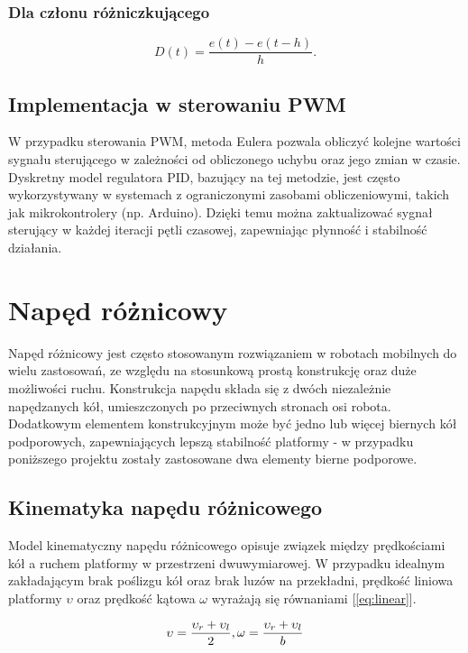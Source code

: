 \subsubsection*{Dla członu różniczkującego}

\begin{equation}
    D(t) = \frac{e(t) - e(t - h)}{h}.
\end{equation}

\subsection{Implementacja w sterowaniu PWM}

W przypadku sterowania PWM, metoda Eulera pozwala obliczyć kolejne wartości sygnału sterującego w zależności od obliczonego uchybu oraz jego zmian w czasie. Dyskretny model regulatora PID, bazujący na tej metodzie, jest często wykorzystywany w systemach z ograniczonymi zasobami obliczeniowymi, takich jak mikrokontrolery (np. Arduino). Dzięki temu można zaktualizować sygnał sterujący w każdej iteracji pętli czasowej, zapewniając płynność i stabilność działania.

\section{Napęd różnicowy}

Napęd różnicowy jest często stosowanym rozwiązaniem w robotach mobilnych do wielu zastosowań, ze względu na stosunkową prostą konstrukcję oraz duże możliwości ruchu.  Konstrukcja napędu składa się z dwóch niezależnie napędzanych kół, umieszczonych po przeciwnych stronach osi robota. Dodatkowym elementem konstrukcyjnym może być jedno lub więcej biernych kół podporowych, zapewniających lepszą stabilność platformy - w przypadku poniższego projektu zostały zastosowane dwa elementy bierne podporowe. 

\subsection{Kinematyka napędu różnicowego}

Model kinematyczny napędu różnicowego opisuje związek między prędkościami kół a ruchem platformy w przestrzeni dwuwymiarowej. W przypadku idealnym zakładającym brak poślizgu kół oraz brak luzów na przekładni, prędkość liniowa platformy \(\upsilon\) oraz prędkość kątowa \(\omega\) wyrażają się równaniami [\ref{eq:linear}].

\begin{equation}
    \centering
    \upsilon = \frac{\upsilon_r + \upsilon_l}{2},  \omega = \frac{\upsilon_r + \upsilon_l}{b}
    \label{eq:linear}
\end{equation}

